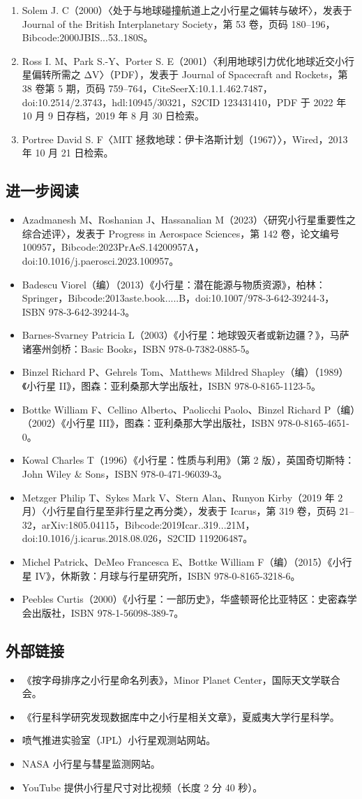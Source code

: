 \begin{enumerate}
\item Solem J. C（2000）〈处于与地球碰撞航道上之小行星之偏转与破坏〉，发表于 Journal of the British Interplanetary Society，第 53 卷，页码 180–196，Bibcode:2000JBIS...53..180S。
\item Ross I. M、Park S.-Y、Porter S. E（2001）〈利用地球引力优化地球近交小行星偏转所需之 ΔV〉（PDF），发表于 Journal of Spacecraft and Rockets，第 38 卷第 5 期，页码 759–764，CiteSeerX:10.1.1.462.7487，doi:10.2514/2.3743，hdl:10945/30321，S2CID 123431410，PDF 于 2022 年 10 月 9 日存档，2019 年 8 月 30 日检索。
\item Portree David S. F〈MIT 拯救地球：伊卡洛斯计划（1967）〉，Wired，2013 年 10 月 21 日检索。
\end{enumerate}
\subsection{进一步阅读}
\begin{itemize}
\item Azadmanesh M、Roshanian J、Hassanalian M（2023）〈研究小行星重要性之综合述评〉，发表于 Progress in Aerospace Sciences，第 142 卷，论文编号 100957，Bibcode:2023PrAeS.14200957A，doi:10.1016/j.paerosci.2023.100957。
\item Badescu Viorel（编）（2013）《小行星：潜在能源与物质资源》，柏林：Springer，Bibcode:2013aste.book.....B，doi:10.1007/978-3-642-39244-3，ISBN 978-3-642-39244-3。
\item Barnes-Svarney Patricia L（2003）《小行星：地球毁灭者或新边疆？》，马萨诸塞州剑桥：Basic Books，ISBN 978-0-7382-0885-5。
\item Binzel Richard P、Gehrels Tom、Matthews Mildred Shapley（编）（1989）《小行星 II》，图森：亚利桑那大学出版社，ISBN 978-0-8165-1123-5。
\item Bottke William F、Cellino Alberto、Paolicchi Paolo、Binzel Richard P（编）（2002）《小行星 III》，图森：亚利桑那大学出版社，ISBN 978-0-8165-4651-0。
\item Kowal Charles T（1996）《小行星：性质与利用》（第 2 版），英国奇切斯特：John Wiley & Sons，ISBN 978-0-471-96039-3。
\item Metzger Philip T、Sykes Mark V、Stern Alan、Runyon Kirby（2019 年 2 月）〈小行星自行星至非行星之再分类〉，发表于 Icarus，第 319 卷，页码 21–32，arXiv:1805.04115，Bibcode:2019Icar..319...21M，doi:10.1016/j.icarus.2018.08.026，S2CID 119206487。
\item Michel Patrick、DeMeo Francesca E、Bottke William F（编）（2015）《小行星 IV》，休斯敦：月球与行星研究所，ISBN 978-0-8165-3218-6。
\item Peebles Curtis（2000）《小行星：一部历史》，华盛顿哥伦比亚特区：史密森学会出版社，ISBN 978-1-56098-389-7。
\end{itemize}
\subsection{外部链接}
\begin{itemize}
\item 《按字母排序之小行星命名列表》，Minor Planet Center，国际天文学联合会。
\item 《行星科学研究发现数据库中之小行星相关文章》，夏威夷大学行星科学。
\item 喷气推进实验室（JPL）小行星观测站网站。
\item NASA 小行星与彗星监测网站。
\item YouTube 提供小行星尺寸对比视频（长度 2 分 40 秒）。
\end{itemize}